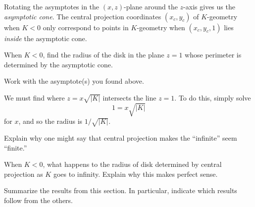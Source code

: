 \documentclass{ximera}
\begin{document}
Rotating the asymptotes in the $(x,z)$-plane around the $z$-axis gives
us the \textit{asymptotic cone}.  The central projection coordinates
$(x_{c},y_{c})$ of $K$-geometry when $K<0$ only correspond to points
in $K$-geometry when $(x_{c},y_{c},1)$ lies \textit{inside} the
asymptotic cone.

\begin{problem}
  When $K<0$, find the radius of the disk in the plane $z=1$ whose
  perimeter is determined by the asymptotic cone. 
  \begin{hint}
    Work with the asymptote(s) you found above.
  \end{hint}
  \begin{freeResponse}
    We must find where $z = x\sqrt{|K|}$ intersects the line $z=1$. To do this, simply solve
    \[
    1 = x\sqrt{|K|}
    \]
    for $x$, and so the radius is $1/\sqrt{|K|}$.
  \end{freeResponse}
\end{problem}

\begin{problem}
  Explain why one might say that central projection makes the
  ``infinite'' seem ``finite.''
    \begin{freeResponse}
    \end{freeResponse}
\end{problem}


\begin{problem}
  When $K<0$, what happens to the radius of disk determined by central
  projection as $K$ goes to infinity. Explain why this makes perfect
  sense.
\end{problem}




\begin{problem}
Summarize the results from this section. In particular, indicate which
results follow from the others.
\begin{freeResponse}
\end{freeResponse}
\end{problem}
\end{document}
